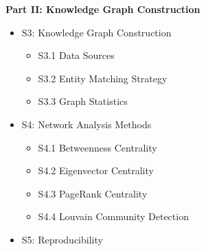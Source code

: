 \documentclass[12pt,a4paper]{article}
\begin{document}
\noindent\textbf{Part II: Knowledge Graph Construction}
\begin{itemize}
    \setlength{\itemsep}{0pt}
    \item[] S3: Knowledge Graph Construction \dotfill \pageref{sec:s3}
    \begin{itemize}
        \setlength{\itemsep}{0pt}
        \item[] S3.1 Data Sources
        \item[] S3.2 Entity Matching Strategy
        \item[] S3.3 Graph Statistics
    \end{itemize}
    \item[] S4: Network Analysis Methods \dotfill \pageref{sec:s4}
    \begin{itemize}
        \setlength{\itemsep}{0pt}
        \item[] S4.1 Betweenness Centrality
        \item[] S4.2 Eigenvector Centrality
        \item[] S4.3 PageRank Centrality
        \item[] S4.4 Louvain Community Detection
    \end{itemize}
    \item[] S5: Reproducibility \dotfill \pageref{sec:s5}
\end{itemize}
\end{document}
